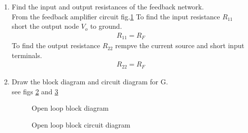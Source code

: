 \begin{enumerate}[label=\arabic*.,ref=\theenumi]
%
%
\begin{figure}[ht!]
	\begin{center}
		\resizebox{\columnwidth}{!}{}
	\end{center}
	\caption{Feedback circuit}
	\label{fig:ee18btech11046_fc}
\end{figure}
\renewcommand{\thefigure}{\theenumi}
%

From KVl on \ref{fig:ee18btech11046_fc} we can see that
\begin{align}
H=\frac{I_{F}}{V_{o}} = -\frac{1}{R_{F}}
\end{align}

\item Find the input and output resistances of the feedback network.\\
\solution
From the feedback amplifier circuit fig.\ref{fig:ee18btech11046_fc}
To find the input resistance $R_{11}$ short
the output node $V_{o}$ to ground.
\begin{align}
R_{11} = R_{F}
\end{align}
To find the output resistance $R_{22}$ rempve the current source and short input terminals.
\begin{align}
R_{22} = R_{F}
\end{align}

\item Draw the block diagram and circuit diagram for G.
\\
\solution see figs \ref{fig:ee18btech11046_Gblock} and \ref{fig:ee18btech11046_Gcir}
%
\renewcommand{\thefigure}{\theenumi.\arabic{figure}}

\begin{figure}[ht!]
	\begin{center}
		\resizebox{\columnwidth}{!}{}
	\end{center}
	\caption{Open loop block diagram}
	\label{fig:ee18btech11046_Gblock}
\end{figure}

%
\begin{figure}[ht!]
	\begin{center}
		\resizebox{\columnwidth}{!}{}
	\end{center}
	\caption{Open loop block circuit diagram}
	\label{fig:ee18btech11046_Gcir}
\end{figure}


\end{enumerate}
